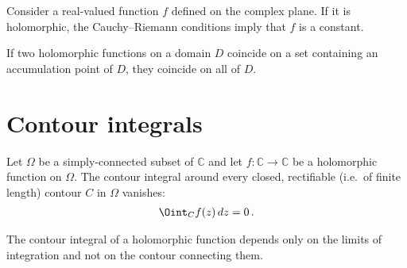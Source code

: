     \begin{property}
        Consider a real-valued function $f$ defined on the complex plane. If it is holomorphic, the Cauchy--Riemann conditions imply that $f$ is a constant.
    \end{property}

    \begin{theorem}
        If two holomorphic functions on a domain $D$ coincide on a set containing an accumulation point of $D$, they coincide on all of $D$.
    \end{theorem}

\section{Contour integrals}



    \begin{theorem}\label{complex:cauchy_integral_theorem}
        Let $\Omega$ be a simply-connected subset of $\mathbb{C}$ and let $f:\mathbb{C}\rightarrow\mathbb{C}$ be a holomorphic function on $\Omega$. The contour integral around every closed, rectifiable (i.e.~of finite length) contour $C$ in $\Omega$ vanishes:
        \begin{gather}
            \Oint_Cf(z)\,dz = 0\,.
        \end{gather}
    \end{theorem}
    \begin{result}
        The contour integral of a holomorphic function depends only on the limits of integration and not on the contour connecting them.
    \end{result}

